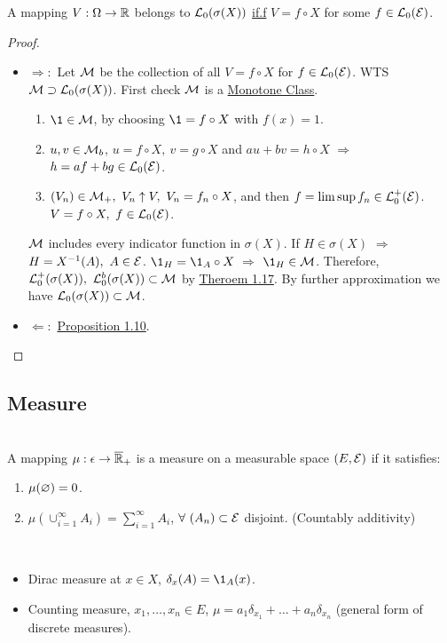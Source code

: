 \vspace{6pt}
\begin{theorem}
A mapping $V: \Omega \to \mathbb{R}$ belongs to $\mathcal{L}_0(\sigma(X))$ \underline{if.f} $V = f \circ X$ for some $f \in \mathcal{L}_0(\mathcal{E})$.
\end{theorem}
\begin{proof}\ 
\begin{itemize}
    \item $\Rightarrow:$ Let $\mathcal{M}$ be the collection of all $V = f \circ X$ for $f \in \mathcal{L}_0(\mathcal{E})$. WTS $\mathcal{M} \supset \mathcal{L}_0(\sigma(X))$. First check $\mathcal{M}$ is a \underline{Monotone Class}.
    \begin{enumerate}[label = (\arabic*)]
        \item $\1 \in \Ms$, by choosing $\1 = f \circ X$ with $f(x) = 1$.
        \item $u,v \in \mathcal{M}_b$, $u = f \circ X,\ v = g \circ X$ and $au + bv = h \circ X$ $\Rightarrow$ $h = af + bg \in \mathcal{L}_0(\mathcal{E})$.
        \item $(V_n) \in \mathcal{M}_+,\ V_n \uparrow V,\ V_n = f_n \circ X$, and then $f = \limsup{f_n} \in \mathcal{L}_0^+ (\mathcal{E})$. $V = f \circ X,\ f \in \mathcal{L}_0(\mathcal{E})$. 
    \end{enumerate}
    $\mathcal{M}$ includes every indicator function in $\sigma(X)$. If $H \in \sigma(X)$ $\Rightarrow$ $H = X^{-1} (A),\ A \in \mathcal{E}$. $\1_H = \1_A \circ X$ $\Rightarrow$ $\1_H \in \Ms$. Therefore, $\mathcal{L}_0^+(\sigma(X)),\ \mathcal{L}_0^b(\sigma(X)) \subset \mathcal{M}$ by \hyperref[1.17]{Theroem 1.17}. By further approximation we have $\mathcal{L}_0(\sigma(X)) \subset \mathcal{M}$.
    \item $\Leftarrow:$ \hyperref[1.10]{Proposition 1.10}.
\end{itemize}
\end{proof}


\vspace{12pt}
\subsection{Measure}

\begin{definition}\ \\
A mapping $\mu: \epsilon \to \overline{\mathbb{R}}_+$ is a measure on a measurable space $(E,\mathcal{E})$ if it satisfies:
\begin{enumerate}[label = (\alph*)]
    \item $\mu(\varnothing) = 0$.
    \item $\mu(\cup_{i = 1}^\infty A_i) = \sum_{i = 1}^\infty A_i$, $\forall\ (A_n) \subset \mathcal{E}$ disjoint. (Countably additivity)
\end{enumerate}
\end{definition}
\begin{examples}\
\begin{itemize}
    \item Dirac measure at $x \in X$, $\delta_x(A) = \1_{A}(x)$.
    \item Counting measure, $x_1,\dots,x_n \in E$, $\mu = a_1\delta_{x_1} + \dots + a_n\delta_{x_n}$ (general form of discrete measures).
\end{itemize}
\end{examples}

